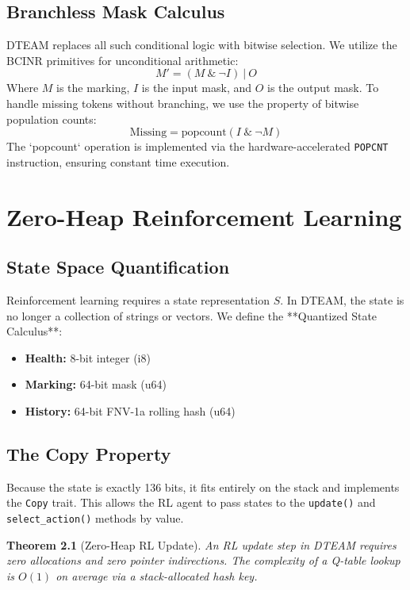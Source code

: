 \documentclass[12pt,a4paper]{report}
\newtheorem{theorem}{Theorem}
\begin{document}
\section{Branchless Mask Calculus}
DTEAM replaces all such conditional logic with bitwise selection. We utilize the BCINR primitives for unconditional arithmetic:
\begin{equation}
M' = (M \ \& \ \neg I) \ | \ O
\end{equation}
Where $M$ is the marking, $I$ is the input mask, and $O$ is the output mask. To handle missing tokens without branching, we use the property of bitwise population counts:
\begin{equation}
\text{Missing} = \text{popcount}(I \ \& \ \neg M)
\end{equation}
The `popcount` operation is implemented via the hardware-accelerated \texttt{POPCNT} instruction, ensuring constant time execution.

\chapter{Zero-Heap Reinforcement Learning}
\section{State Space Quantification}
Reinforcement learning requires a state representation $S$. In DTEAM, the state is no longer a collection of strings or vectors. We define the **Quantized State Calculus**:
\begin{itemize}
    \item \textbf{Health:} 8-bit integer (i8)
    \item \textbf{Marking:} 64-bit mask (u64)
    \item \textbf{History:} 64-bit FNV-1a rolling hash (u64)
\end{itemize}

\section{The Copy Property}
Because the state is exactly 136 bits, it fits entirely on the stack and implements the \texttt{Copy} trait. This allows the RL agent to pass states to the \texttt{update()} and \texttt{select\_action()} methods by value.
\begin{theorem}[Zero-Heap RL Update]
An RL update step in DTEAM requires zero allocations and zero pointer indirections. The complexity of a Q-table lookup is $O(1)$ on average via a stack-allocated hash key.
\end{theorem}
\end{document}
